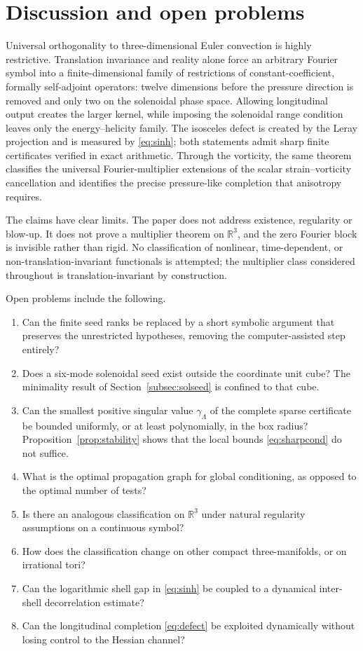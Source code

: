 \documentclass[11pt]{article}
\theoremstyle{definition}
\theoremstyle{remark}
\theoremstyle{plain}
\newcommand{\R}{\mathbb{R}}
\begin{document}
\section{Discussion and open problems}
\label{sec:discussion}

Universal orthogonality to three-dimensional Euler convection is highly
restrictive. Translation invariance and reality alone force an arbitrary Fourier symbol into a
finite-dimensional family of restrictions of constant-coefficient, formally
self-adjoint operators: twelve dimensions before the pressure direction is
removed and only two on the solenoidal phase space. Allowing longitudinal
output creates the larger kernel, while imposing the solenoidal range
condition leaves only the energy--helicity family. The isosceles defect is
created by the Leray projection and is measured by \eqref{eq:sinh}; both
statements admit sharp finite certificates
verified in exact arithmetic. Through the vorticity, the same theorem
classifies the universal Fourier-multiplier extensions of the scalar
strain--vorticity cancellation and identifies the precise pressure-like
completion that anisotropy requires.

The claims have clear limits. The paper does not address existence,
regularity or blow-up. It does not prove a multiplier theorem on $\R^{3}$, and
the zero Fourier block is invisible rather than rigid. No classification of
nonlinear, time-dependent, or non-translation-invariant functionals is
attempted; the multiplier class considered throughout is translation-invariant
by construction.

Open problems include the following.
\begin{enumerate}
\item Can the finite seed ranks be replaced by a short symbolic argument that
preserves the unrestricted hypotheses, removing the computer-assisted step
entirely?
\item Does a six-mode solenoidal seed exist outside the coordinate unit cube?
The minimality result of Section~\ref{subsec:solseed} is confined to that cube.
\item\label{prob:gamma} Can the smallest positive singular value
$\gamma_{\Lambda}$ of the complete sparse certificate be bounded uniformly, or
at least polynomially, in the box radius? Proposition~\ref{prop:stability}
shows that the local bounds \eqref{eq:sharpcond} do not suffice.
\item What is the optimal propagation graph for global conditioning, as
opposed to the optimal number of tests?
\item Is there an analogous classification on $\R^{3}$ under natural
regularity assumptions on a continuous symbol?
\item How does the classification change on other compact three-manifolds, or
on irrational tori?
\item Can the logarithmic shell gap in \eqref{eq:sinh} be coupled to a
dynamical inter-shell decorrelation estimate?
\item Can the longitudinal completion \eqref{eq:defect} be exploited
dynamically without losing control to the Hessian channel?
\end{enumerate}
\end{document}

